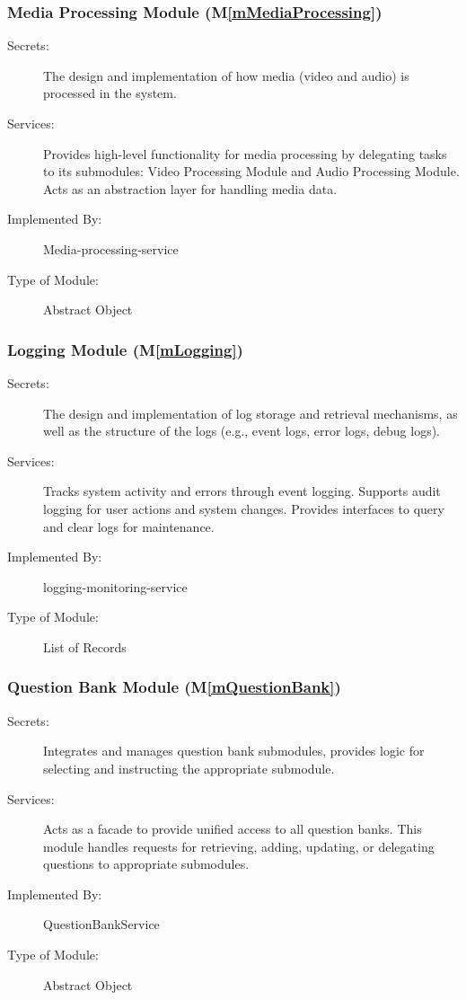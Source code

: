 \documentclass[12pt, titlepage]{article}
\newcommand{\mref}[1]{M\ref{#1}}
\begin{document}
\subsubsection{Media Processing Module (\mref{mMediaProcessing})}
\begin{description}
\item[Secrets:] The design and implementation of how media (video and audio) is processed in the system.
\item[Services:] Provides high-level functionality for media processing by delegating tasks to its submodules: Video Processing Module and Audio Processing Module. Acts as an abstraction layer for handling media data.
\item[Implemented By:] Media-processing-service
\item[Type of Module:]  Abstract Object
\end{description}

\subsubsection{Logging Module (\mref{mLogging})}
\begin{description}
\item[Secrets:] The design and implementation of log storage and retrieval mechanisms, as well as the structure of the logs (e.g., event logs, error logs, debug logs).
\item[Services:] Tracks system activity and errors through event logging. Supports audit logging for user actions and system changes.
Provides interfaces to query and clear logs for maintenance.
\item[Implemented By:] logging-monitoring-service
\item[Type of Module:] List of Records
\end{description}

\subsubsection{Question Bank Module (\mref{mQuestionBank})}

\begin{description}
\item[Secrets:]Integrates and manages question bank submodules, provides logic for
 selecting and instructing the appropriate submodule.
\item[Services:]Acts as a facade to provide unified access to all question banks.
This module handles requests for retrieving, adding, updating, or delegating questions 
to appropriate submodules.
\item[Implemented By:] QuestionBankService
\item[Type of Module:] Abstract Object
\end{description}
\end{document}
